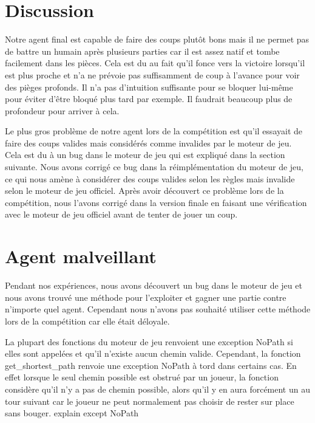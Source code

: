 \documentclass[12pt]{article}
\begin{document}


\section*{Discussion}

Notre agent final est capable de faire des coups plutôt bons mais il ne permet pas de battre un humain après plusieurs parties car il est assez natif et tombe facilement dans les pièces. Cela est du au fait qu'il fonce vers la victoire lorsqu'il est plus proche et n'a ne prévoie pas suffisamment de coup à l'avance pour voir des pièges profonds. Il n'a pas d'intuition suffisante pour se bloquer lui-même pour éviter d'être bloqué plus tard par exemple. Il faudrait beaucoup plus de profondeur pour arriver à cela. 

Le plus gros problème de notre agent lors de la compétition est qu'il essayait de faire des coups valides mais considérés comme invalides par le moteur de jeu. Cela est du à un bug dans le moteur de jeu qui est expliqué dans la section suivante. Nous avons corrigé ce bug dans la réimplémentation du moteur de jeu, ce qui nous amène à considérer des coups valides selon les règles mais invalide selon le moteur de jeu officiel. Après avoir découvert ce problème lors de la compétition, nous l'avons corrigé dans la version finale en faisant une vérification avec le moteur de jeu officiel avant de tenter de jouer un coup. 

\section*{Agent malveillant}

Pendant nos expériences, nous avons découvert un bug dans le moteur de jeu et nous avons trouvé une méthode pour l'exploiter et gagner une partie contre n'importe quel agent. Cependant nous n'avons pas souhaité utiliser cette méthode lors de la compétition car elle était déloyale. 

La plupart des fonctions du moteur de jeu renvoient une exception NoPath si elles sont appelées et qu'il n'existe aucun chemin valide. Cependant, la fonction get\_shortest\_path renvoie une exception NoPath à tord dans certains cas. En effet lorsque le seul chemin possible est obstrué par un joueur, la fonction considère qu'il n'y a pas de chemin possible, alors qu'il y en aura forcément un au tour suivant car le joueur ne peut normalement pas choisir de rester sur place sans bouger.
explain except NoPath
\end{document}

